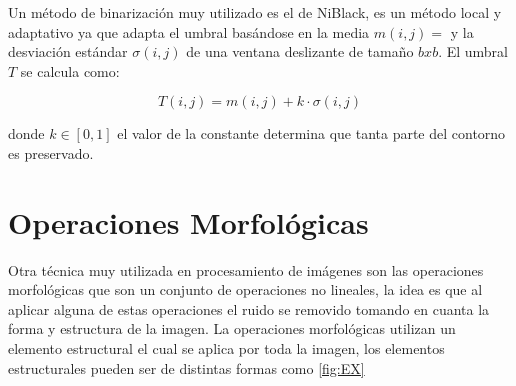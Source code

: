 Un método de binarización muy utilizado es el de NiBlack, \citep{Chaki2014} es un método local y adaptativo ya que adapta el umbral basándose en la media $m(i,j)=$ y la desviación estándar $\sigma(i,j)$ de una ventana deslizante de tamaño $bxb$. El umbral $T$  se calcula como: 

$$T(i,j)=m(i,j)+k \cdot \sigma(i,j)$$ 

donde $k \in [0,1]$ el valor de la constante determina que tanta parte del contorno es preservado.


  
\section{Operaciones Morfológicas}\label{OperacionesMorfologicas} 

Otra técnica muy utilizada en procesamiento de imágenes son las operaciones morfológicas que son un conjunto de operaciones no lineales, la idea es que al aplicar alguna de estas operaciones el ruido se removido tomando en cuanta la forma y estructura de la imagen. 
La operaciones morfológicas utilizan un elemento estructural el cual se aplica por toda la imagen, los elementos estructurales pueden ser de distintas formas como \ref{fig:EX}

